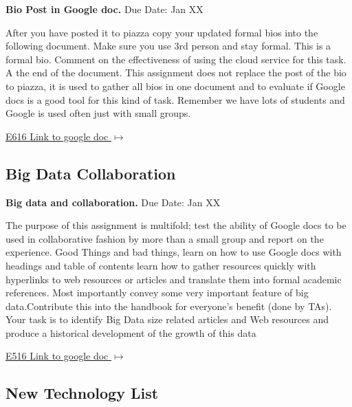 \begin{exercise} \label{a:e616-bio-googledocs}

 {\bf Bio Post in Google doc.} Due Date: Jan XX
 
 After you have posted it to piazza copy your updated formal bios into the following document. Make sure you use 3rd person and stay formal. This is a formal bio. Comment on the effectiveness of using the cloud service for this task. A the end of the document. This assignment does not replace the post of the bio to piazza, it is used to gather all bios in one document and to evaluate if Google docs is a good tool for this kind of task. Remember we have lots of students and Google is used often just with small groups.
 
 \smallskip

 {\hfill \href{https://docs.google.com/document/d/1ejzlKYqC3dLac8WXVpcPQsJh1j4BDqRxxgGg1cFQbeQ/edit?usp=sharing} {E616 Link to google doc $\mapsto$}}

 \end{exercise}

\subsection{Big Data Collaboration}

\begin{exercise} \label{a:e616-big-data-and-collaboration}

{\bf Big data and collaboration.} Due Date: Jan XX

The purpose of this assignment is multifold; test the ability of Google docs to be used in collaborative fashion by more than a small group and report on the experience. Good Things and bad things, learn on how to use Google docs with headings and table of contents learn how to gather resources quickly with hyperlinks to web resources or articles and translate them into formal academic references. Most importantly convey some very important feature of big data.Contribute this into the handbook for everyone's benefit (done by TAs). Your task is to identify Big Data size related articles and Web resources and produce a historical development of the growth of this data

  {\hfill \href{https://docs.google.com/document/d/1ZHNdhX_Jx7uBQo0kthSYQ6TQR8_KNbgOwH2EuqBQcjY/edit?usp=sharing}{E516 Link to google doc $\mapsto$}}

\end{exercise}

\subsection{New Technology List}


